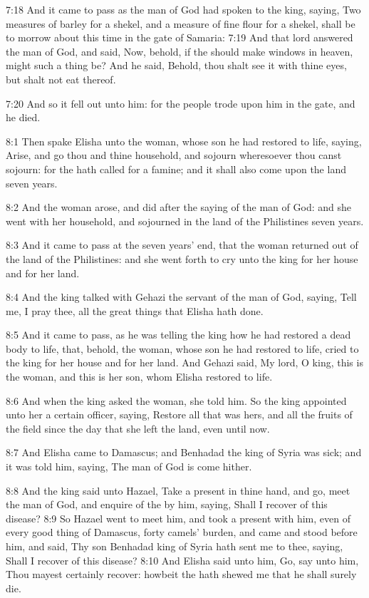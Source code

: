 7:18 And it came to pass as the man of God had spoken to the king,
saying, Two measures of barley for a shekel, and a measure of fine
flour for a shekel, shall be to morrow about this time in the gate of
Samaria: 7:19 And that lord answered the man of God, and said, Now,
behold, if the \LORD should make windows in heaven, might such a thing
be? And he said, Behold, thou shalt see it with thine eyes, but shalt
not eat thereof.

7:20 And so it fell out unto him: for the people trode upon him in the
gate, and he died.

8:1 Then spake Elisha unto the woman, whose son he had restored to
life, saying, Arise, and go thou and thine household, and sojourn
wheresoever thou canst sojourn: for the \LORD hath called for a famine;
and it shall also come upon the land seven years.

8:2 And the woman arose, and did after the saying of the man of God:
and she went with her household, and sojourned in the land of the
Philistines seven years.

8:3 And it came to pass at the seven years' end, that the woman
returned out of the land of the Philistines: and she went forth to cry
unto the king for her house and for her land.

8:4 And the king talked with Gehazi the servant of the man of God,
saying, Tell me, I pray thee, all the great things that Elisha hath
done.

8:5 And it came to pass, as he was telling the king how he had
restored a dead body to life, that, behold, the woman, whose son he
had restored to life, cried to the king for her house and for her
land. And Gehazi said, My lord, O king, this is the woman, and this is
her son, whom Elisha restored to life.

8:6 And when the king asked the woman, she told him. So the king
appointed unto her a certain officer, saying, Restore all that was
hers, and all the fruits of the field since the day that she left the
land, even until now.

8:7 And Elisha came to Damascus; and Benhadad the king of Syria was
sick; and it was told him, saying, The man of God is come hither.

8:8 And the king said unto Hazael, Take a present in thine hand, and
go, meet the man of God, and enquire of the \LORD by him, saying, Shall
I recover of this disease?  8:9 So Hazael went to meet him, and took a
present with him, even of every good thing of Damascus, forty camels'
burden, and came and stood before him, and said, Thy son Benhadad king
of Syria hath sent me to thee, saying, Shall I recover of this
disease?  8:10 And Elisha said unto him, Go, say unto him, Thou mayest
certainly recover: howbeit the \LORD hath shewed me that he shall
surely die.

